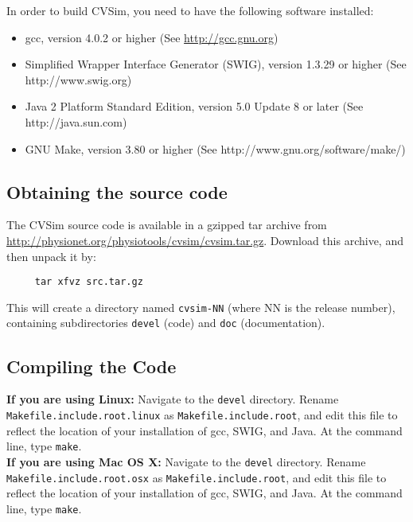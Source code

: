 \documentclass[12pt]{article}
\begin{document}
In order to build CVSim, you need to have the following software installed:

\begin{itemize}
\item gcc, version 4.0.2 or higher 
(See \href{http://gcc.gnu.org}{http://gcc.gnu.org})
\item Simplified Wrapper Interface Generator (SWIG), version 1.3.29 or higher 
(See http://www.swig.org)
\item Java 2 Platform Standard Edition, version 5.0 Update 8 or later
(See http://java.sun.com)
\item GNU Make, version 3.80 or higher 
(See http://www.gnu.org/software/make/)
\end{itemize}

\subsection{Obtaining the source code}

The CVSim source code is available in a gzipped tar archive from
\href{http://physionet.org/physiotools/cvsim/cvsim.tar.gz}{http://physionet.org/physiotools/cvsim/cvsim.tar.gz}.  Download this archive, and then unpack it by:

\begin{verbatim}
     tar xfvz src.tar.gz
\end{verbatim}

This will create a directory named \texttt{cvsim-NN} (where NN is the
release number), containing subdirectories
\texttt{devel} (code) and \texttt{doc} (documentation).

\subsection{Compiling the Code}

\noindent \textbf{If you are using Linux:}
Navigate to the \texttt{devel} directory.  Rename
\texttt{Makefile.include.root.linux} as
\texttt{Makefile.include.root}, and edit this file to 
reflect the location of your installation of gcc, SWIG, and Java. 
At the command line, type \texttt{make}. \\

\noindent \textbf{If you are using Mac OS X:}
Navigate to the \texttt{devel} directory.  Rename
\texttt{Makefile.include.root.osx} as
\texttt{Makefile.include.root}, and edit this file to 
reflect the location of your installation of gcc, SWIG, and Java. 
At the command line, type \texttt{make}. \\
\end{document}
